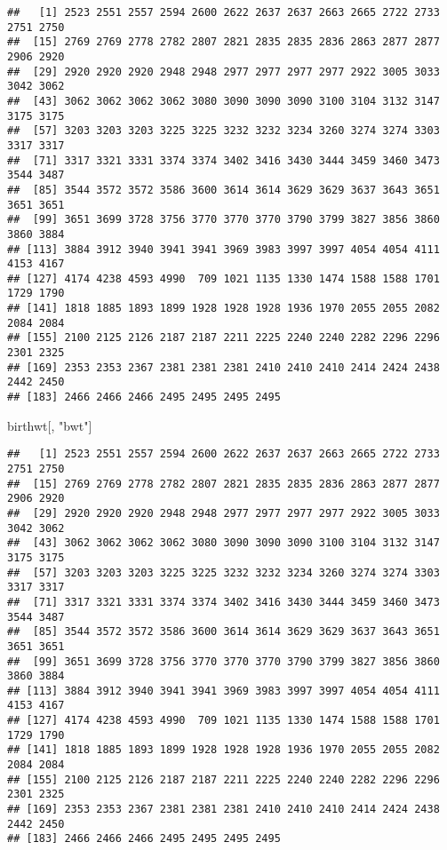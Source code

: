 \documentclass[]{book}
\newenvironment{Shaded}{\begin{snugshade}}{\end{snugshade}}
\newcommand{\StringTok}[1]{\textcolor[rgb]{0.31,0.60,0.02}{#1}}
\newcommand{\NormalTok}[1]{#1}
\begin{document}
\begin{verbatim}
##   [1] 2523 2551 2557 2594 2600 2622 2637 2637 2663 2665 2722 2733 2751 2750
##  [15] 2769 2769 2778 2782 2807 2821 2835 2835 2836 2863 2877 2877 2906 2920
##  [29] 2920 2920 2920 2948 2948 2977 2977 2977 2977 2922 3005 3033 3042 3062
##  [43] 3062 3062 3062 3062 3080 3090 3090 3090 3100 3104 3132 3147 3175 3175
##  [57] 3203 3203 3203 3225 3225 3232 3232 3234 3260 3274 3274 3303 3317 3317
##  [71] 3317 3321 3331 3374 3374 3402 3416 3430 3444 3459 3460 3473 3544 3487
##  [85] 3544 3572 3572 3586 3600 3614 3614 3629 3629 3637 3643 3651 3651 3651
##  [99] 3651 3699 3728 3756 3770 3770 3770 3790 3799 3827 3856 3860 3860 3884
## [113] 3884 3912 3940 3941 3941 3969 3983 3997 3997 4054 4054 4111 4153 4167
## [127] 4174 4238 4593 4990  709 1021 1135 1330 1474 1588 1588 1701 1729 1790
## [141] 1818 1885 1893 1899 1928 1928 1928 1936 1970 2055 2055 2082 2084 2084
## [155] 2100 2125 2126 2187 2187 2211 2225 2240 2240 2282 2296 2296 2301 2325
## [169] 2353 2353 2367 2381 2381 2381 2410 2410 2410 2414 2424 2438 2442 2450
## [183] 2466 2466 2466 2495 2495 2495 2495
\end{verbatim}

\begin{Shaded}
\begin{Highlighting}[]
\NormalTok{birthwt[, }\StringTok{"bwt"}\NormalTok{]}
\end{Highlighting}
\end{Shaded}

\begin{verbatim}
##   [1] 2523 2551 2557 2594 2600 2622 2637 2637 2663 2665 2722 2733 2751 2750
##  [15] 2769 2769 2778 2782 2807 2821 2835 2835 2836 2863 2877 2877 2906 2920
##  [29] 2920 2920 2920 2948 2948 2977 2977 2977 2977 2922 3005 3033 3042 3062
##  [43] 3062 3062 3062 3062 3080 3090 3090 3090 3100 3104 3132 3147 3175 3175
##  [57] 3203 3203 3203 3225 3225 3232 3232 3234 3260 3274 3274 3303 3317 3317
##  [71] 3317 3321 3331 3374 3374 3402 3416 3430 3444 3459 3460 3473 3544 3487
##  [85] 3544 3572 3572 3586 3600 3614 3614 3629 3629 3637 3643 3651 3651 3651
##  [99] 3651 3699 3728 3756 3770 3770 3770 3790 3799 3827 3856 3860 3860 3884
## [113] 3884 3912 3940 3941 3941 3969 3983 3997 3997 4054 4054 4111 4153 4167
## [127] 4174 4238 4593 4990  709 1021 1135 1330 1474 1588 1588 1701 1729 1790
## [141] 1818 1885 1893 1899 1928 1928 1928 1936 1970 2055 2055 2082 2084 2084
## [155] 2100 2125 2126 2187 2187 2211 2225 2240 2240 2282 2296 2296 2301 2325
## [169] 2353 2353 2367 2381 2381 2381 2410 2410 2410 2414 2424 2438 2442 2450
## [183] 2466 2466 2466 2495 2495 2495 2495
\end{verbatim}
\end{document}
